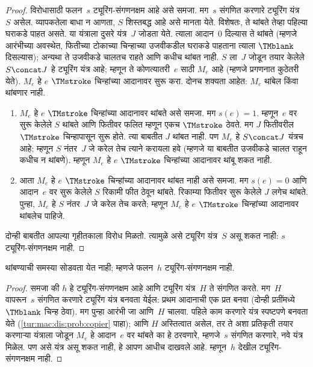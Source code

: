 \documentclass[../../../include/open-logic-section]{subfiles}
\begin{document}
\begin{proof}
विरोधासाठी फलन~$s$ ट्यूरिंग-संगणनक्षम आहे असे
समजा. मग~$s$ संगणित करणारे ट्यूरिंग यंत्र~$S$
असेल. व्यापकतेला बाधा न आणता, $S$ शिस्तबद्ध
आहे असे मानता येते. विशेषतः, ते थांबते
तेव्हा पहिल्या घराकडे पाहत असते.
%
या यंत्राला दुसरे यंत्र~$J$ जोडता येते.
त्याला आदान~$0$ दिल्यास ते थांबते
(म्हणजे आरंभीच्या अवस्थेत, फितीच्या टोकाच्या
चिन्हाच्या उजवीकडील घराकडे पाहताना त्याला
$\TMblank$ दिसल्यास); अन्यथा ते उजवीकडे
चालतच राहते आणि कधीच थांबत नाही.
$S$ ला~$J$ जोडून तयार केलेले
$S \concat J$ हे ट्यूरिंग यंत्र आहे;
म्हणून ते कोणत्यातरी~$e$ साठी $M_e$
आहे (म्हणजे प्रगणनात कुठेतरी येते).
$M_e$ हे $e$ $\TMstroke$ चिन्हांच्या
आदानावर सुरू करा. दोनच शक्यता आहेत:
$M_e$ थांबेल किंवा थांबणार नाही.
\begin{enumerate}
\item $M_e$ हे $e$ $\TMstroke$ चिन्हांच्या
  आदानावर थांबते असे समजा. मग $s(e)
  = 1$. म्हणून~$e$ वर सुरू केलेले $S$
  थांबते आणि फितीवर फलित म्हणून एकच
  $\TMstroke$ ठेवते. मग $J$ फितीवरील
  $\TMstroke$ चिन्हापासून सुरू होते. त्या
  बाबतीत $J$ थांबत नाही. पण $M_e$ हे
  $S \concat J$ यंत्रच आहे; म्हणून $S$
  नंतर~$J$ जे करेल तेच त्याने करायला
  हवे (म्हणजे या बाबतीत उजवीकडे चालत
  राहून कधीच न थांबणे). म्हणून $M_e$
  हे $e$ $\TMstroke$ चिन्हांच्या आदानावर
  थांबू शकत नाही.

\item आता $M_e$ हे $e$ $\TMstroke$
  चिन्हांच्या आदानावर थांबत नाही असे
  समजा. मग $s(e) = 0$ आणि आदान~$e$
  वर सुरू केलेले $S$ रिकामी फीत ठेवून
  थांबते. रिकाम्या फितीवर सुरू केलेले
  $J$ लगेच थांबते. पुन्हा, $M_e$ हे
  $S$ नंतर~$J$ जे करेल तेच करते;
  म्हणून $M_e$ हे $e$ $\TMstroke$
  चिन्हांच्या आदानावर थांबलेच पाहिजे.
\end{enumerate}
दोन्ही बाबतीत आपल्या गृहीतकाला विरोध
मिळतो. त्यामुळे असे ट्यूरिंग यंत्र~$S$
असू शकत नाही: $s$ ट्यूरिंग-संगणनक्षम नाही.
\end{proof}

\begin{thm}
 थांबण्याची समस्या
सोडवता येत नाही; म्हणजे फलन~$h$
ट्यूरिंग-संगणनक्षम नाही.
\end{thm}

\begin{proof}
समजा की $h$ हे ट्यूरिंग-संगणनक्षम आहे आणि
ट्यूरिंग यंत्र~$H$ ते संगणित करते.
मग~$H$ वापरून~$s$ संगणित करणारे ट्यूरिंग
यंत्र बनवता येईल: प्रथम आदानाची एक प्रत
बनवा (दोन्ही प्रतींमध्ये~$\TMblank$ चिन्ह
ठेवा). मग पुन्हा आरंभी जा आणि~$H$
चालवा. पहिले काम करणारे यंत्र स्पष्टपणे
बनवता येते (\cref{tur:mac:dis:prob:copier}
पाहा); आणि $H$ अस्तित्वात असेल, तर
ते अशा प्रतिकृती तयार करणाऱ्या यंत्राला
जोडून $M_e$ हे आदान~$e$ वर थांबते
का हे ठरवणारे, म्हणजे~$s$ संगणित
करणारे, नवे यंत्र मिळेल. पण असे यंत्र
असू शकत नाही, हे आपण आधीच दाखवले
आहे. म्हणून~$h$ देखील ट्यूरिंग-संगणनक्षम
नाही.
\end{proof}
\end{document}
